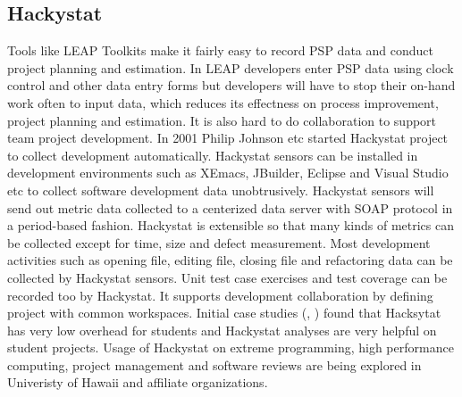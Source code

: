 \subsection{Hackystat}
Tools like LEAP Toolkits make it fairly easy to record PSP data and conduct
project planning and estimation. In LEAP developers enter PSP data using
clock control and other data entry forms but developers will have to stop
their on-hand work often to input data, which reduces its effectness on
process improvement, project planning and estimation. It is also hard to do
collaboration to support team project development. In 2001 Philip Johnson
etc started Hackystat project to collect development automatically.
Hackystat sensors can be installed in development environments such as
XEmacs, JBuilder, Eclipse and Visual Studio etc to collect software
development data unobtrusively. Hackystat sensors will send out metric data
collected to a centerized data server with SOAP protocol \cite{csdl2-04-05}
in a period-based fashion. Hackystat is extensible so that many kinds of
metrics can be collected except for time, size and defect measurement.
Most development activities such as opening file, editing file, closing
file and refactoring data can be collected by Hackystat sensors. Unit test
case exercises and test coverage can be recorded too by Hackystat. It
supports development collaboration by defining project with common
workspaces\cite{csdl2-04-05}. Initial case studies (\cite{csdl2-03-13},
\cite{csdl2-03-12}) found that Hacksytat has very low overhead for students
and Hackystat analyses are very helpful on student projects. Usage of
Hackystat on extreme programming, high performance computing, project
management and software reviews are being explored in Univeristy of Hawaii
and affiliate organizations.



















